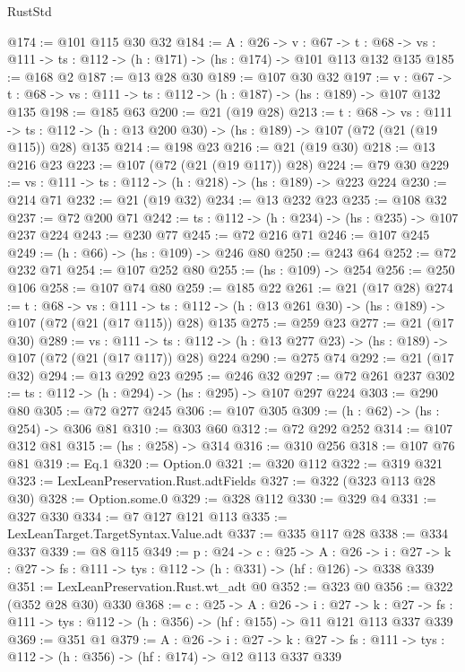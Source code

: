\begin{lexlean}{RustStd}
\begin{coremodule}
@174 := @101 @115 @30 @32
@184 := {A : @26} ->
  {v : @67} ->
  {t : @68} -> {vs : @111} -> {ts : @112} -> (h : @171) -> (hs : @174) -> @101 @113 @132 @135
@185 := @168 @2
@187 := @13 @28 @30
@189 := @107 @30 @32
@197 := {v : @67} ->
  {t : @68} -> {vs : @111} -> {ts : @112} -> (h : @187) -> (hs : @189) -> @107 @132 @135
@198 := @185 @63
@200 := @21 (@19 @28)
@213 := {t : @68} ->
  {vs : @111} ->
  {ts : @112} -> (h : @13 @200 @30) -> (hs : @189) -> @107 (@72 (@21 (@19 @115)) @28) @135
@214 := @198 @23
@216 := @21 (@19 @30)
@218 := @13 @216 @23
@223 := @107 (@72 (@21 (@19 @117)) @28)
@224 := @79 @30
@229 := {vs : @111} -> {ts : @112} -> (h : @218) -> (hs : @189) -> @223 @224
@230 := @214 @71
@232 := @21 (@19 @32)
@234 := @13 @232 @23
@235 := @108 @32
@237 := @72 @200 @71
@242 := {ts : @112} -> (h : @234) -> (hs : @235) -> @107 @237 @224
@243 := @230 @77
@245 := @72 @216 @71
@246 := @107 @245
@249 := (h : @66) -> (hs : @109) -> @246 @80
@250 := @243 @64
@252 := @72 @232 @71
@254 := @107 @252 @80
@255 := (hs : @109) -> @254
@256 := @250 @106
@258 := @107 @74 @80
@259 := @185 @22
@261 := @21 (@17 @28)
@274 := {t : @68} ->
  {vs : @111} ->
  {ts : @112} -> (h : @13 @261 @30) -> (hs : @189) -> @107 (@72 (@21 (@17 @115)) @28) @135
@275 := @259 @23
@277 := @21 (@17 @30)
@289 := {vs : @111} ->
  {ts : @112} -> (h : @13 @277 @23) -> (hs : @189) -> @107 (@72 (@21 (@17 @117)) @28) @224
@290 := @275 @74
@292 := @21 (@17 @32)
@294 := @13 @292 @23
@295 := @246 @32
@297 := @72 @261 @237
@302 := {ts : @112} -> (h : @294) -> (hs : @295) -> @107 @297 @224
@303 := @290 @80
@305 := @72 @277 @245
@306 := @107 @305
@309 := (h : @62) -> (hs : @254) -> @306 @81
@310 := @303 @60
@312 := @72 @292 @252
@314 := @107 @312 @81
@315 := (hs : @258) -> @314
@316 := @310 @256
@318 := @107 @76 @81
@319 := Eq.{1}
@320 := Option.{0}
@321 := @320 @112
@322 := @319 @321
@323 := LexLeanPreservation.Rust.adtFields
@327 := @322 (@323 @113 @28 @30)
@328 := Option.some.{0}
@329 := @328 @112
@330 := @329 @4
@331 := @327 @330
@334 := @7 @127 @121 @113
@335 := LexLeanTarget.TargetSyntax.Value.adt
@337 := @335 @117 @28
@338 := @334 @337
@339 := @8 @115
@349 := {p : @24} ->
  {c : @25} ->
  {A : @26} ->
  {i : @27} -> {k : @27} -> {fs : @111} -> {tys : @112} -> (h : @331) -> (hf : @126) -> @338 @339
@351 := LexLeanPreservation.Rust.wt_adt @0
@352 := @323 @0
@356 := @322 (@352 @28 @30) @330
@368 := {c : @25} ->
  {A : @26} ->
  {i : @27} ->
  {k : @27} -> {fs : @111} -> {tys : @112} -> (h : @356) -> (hf : @155) -> @11 @121 @113 @337 @339
@369 := @351 @1
@379 := {A : @26} ->
  {i : @27} ->
  {k : @27} -> {fs : @111} -> {tys : @112} -> (h : @356) -> (hf : @174) -> @12 @113 @337 @339

\end{coremodule}
\end{lexlean}
